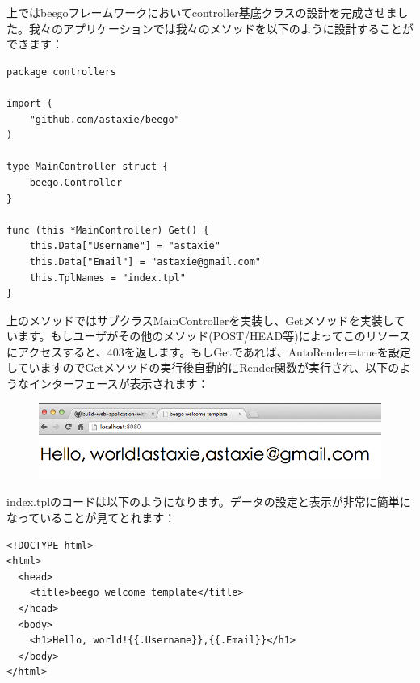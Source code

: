 上ではbeegoフレームワークにおいてcontroller基底クラスの設計を完成させました。我々のアプリケーションでは我々のメソッドを以下のように設計することができます：

\begin{lstlisting}[numbers=none]
package controllers

import (
    "github.com/astaxie/beego"
)

type MainController struct {
    beego.Controller
}

func (this *MainController) Get() {
    this.Data["Username"] = "astaxie"
    this.Data["Email"] = "astaxie@gmail.com"
    this.TplNames = "index.tpl"
}
\end{lstlisting}

上のメソッドではサブクラスMainControllerを実装し、Getメソッドを実装しています。もしユーザがその他のメソッド(POST/HEAD等)によってこのリソースにアクセスすると、403を返します。もしGetであれば、AutoRender=trueを設定していますのでGetメソッドの実行後自動的にRender関数が実行され、以下のようなインターフェースが表示されます：

\begin{figure}[H]
   \includegraphics[width=14cm]{13.4.beego.png}
   \label{}
   \caption{}
\end{figure}

index.tplのコードは以下のようになります。データの設定と表示が非常に簡単になっていることが見てとれます：

\begin{lstlisting}[numbers=none]
<!DOCTYPE html>
<html>
  <head>
    <title>beego welcome template</title>
  </head>
  <body>
    <h1>Hello, world!{{.Username}},{{.Email}}</h1>
  </body>
</html>
\end{lstlisting}


